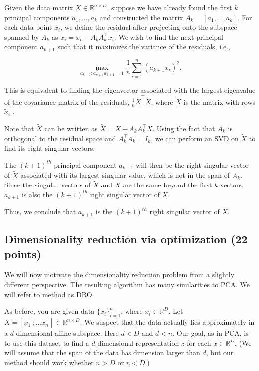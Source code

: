 \documentclass[a4paper]{article}
\newcounter{thm}
\theoremstyle{definition}
\newcommand{\RR}{\mathbb{R}}
\newenvironment{soln}{
    \leavevmode\color{blue}\ignorespaces
}{}
\begin{document}
\begin{enumerate}
\begin{soln}
Given the data matrix \( X \in \mathbb{R}^{n \times D} \), suppose we have already found the first \( k \) principal components \( a_1, \dots, a_k \) and constructed the matrix \( A_k = [a_1, \dots, a_k] \). For each data point \( x_i \), we define the residual after projecting onto the subspace spanned by \( A_k \) as \( \tilde{x}_i = x_i - A_kA_k^\top x_i \). We wish to find the next principal component \( a_{k+1} \) such that it maximizes the variance of the residuals, i.e.,

\begin{equation}
\max_{a_{k+1}: a_{k+1}^\top a_{k+1} = 1} \frac{1}{n} \sum_{i=1}^n (a_{k+1}^\top \tilde{x}_i)^2.
\end{equation}
  
This is equivalent to finding the eigenvector associated with the largest eigenvalue of the covariance matrix of the residuals, \( \frac{1}{n}\tilde{X}^\top \tilde{X} \), where \( \tilde{X} \) is the matrix with rows \( \tilde{x}_i^\top \).
  
Note that \( \tilde{X} \) can be written as \( \tilde{X} = X - A_kA_k^\top X \). Using the fact that \( A_k \) is orthogonal to the residual space and \( A_k^\top A_k = I_k \), we can perform an SVD on \( \tilde{X} \) to find its right singular vectors.
  
The \((k+1)^{th}\) principal component \( a_{k+1} \) will then be the right singular vector of \( \tilde{X} \) associated with its largest singular value, which is not in the span of \( A_k \). Since the singular vectors of \( \tilde{X} \) and \( X \) are the same beyond the first \( k \) vectors, \( a_{k+1} \) is also the \((k+1)^{th}\) right singular vector of \( X \).
 
Thus, we conclude that \( a_{k+1} \) is the \((k+1)^{th}\) right singular vector of \( X \).
\end{soln}

\end{enumerate}

\subsection{Dimensionality reduction via optimization (22 points)}

We will now motivate the dimensionality reduction problem from a slightly different
perspective. The resulting algorithm has many similarities to PCA.
We will refer to method as DRO.

As before, you are given data $\{x_i\}_{i=1}^n$, where $x_i \in \RR^D$. Let $X=[x_1^\top; \dots
x_n^\top] \in \RR^{n\times D}$. We suspect that the data
actually lies approximately in  a $d$ dimensional affine subspace.
Here $d<D$ and $d<n$.
Our goal, as in PCA, is to use this dataset to find a $d$ dimensional representation $z$ for each $x\in\RR^D$.
(We will assume that the span of the data has dimension larger than
$d$, but our method should work whether $n>D$ or $n<D$.)
\end{document}
